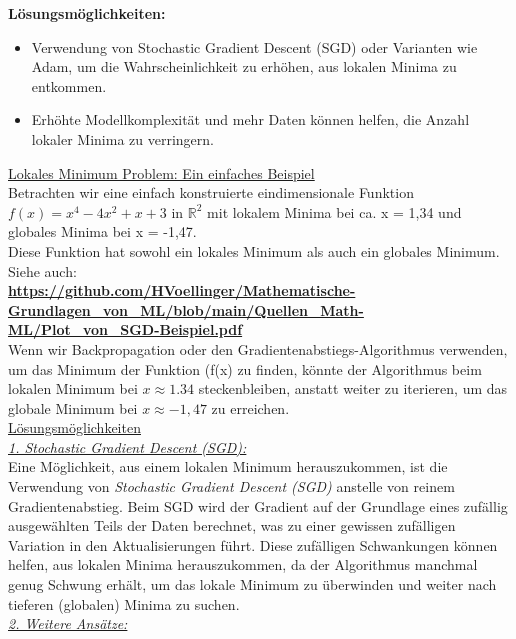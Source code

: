 \documentclass[12pt]{article}
\begin{document}
\textbf{Lösungsmöglichkeiten:}
\begin{itemize}
    \item Verwendung von Stochastic Gradient Descent (SGD) oder Varianten wie Adam, um die Wahrscheinlichkeit zu erhöhen, aus lokalen Minima zu entkommen.
    \item Erhöhte Modellkomplexität und mehr Daten können helfen, die Anzahl lokaler Minima zu verringern.
\end{itemize}
%
%
\underline{Lokales Minimum Problem: Ein einfaches Beispiel}\\[0.3cm]
%
Betrachten wir eine einfach konstruierte eindimensionale Funktion $ f(x) = x^4 - 4x^2 + x + 3 $ in $ \mathbb{R}^2 $ mit lokalem Minima bei ca. x = 1,34 und globales Minima bei x = -1,47.  \\
Diese Funktion hat sowohl ein lokales Minimum als auch ein globales Minimum. Siehe auch:  \\
\textbf{\url{https://github.com/HVoellinger/Mathematische-Grundlagen_von_ML/blob/main/Quellen_Math-ML/Plot_von_SGD-Beispiel.pdf}}\\[0.3cm]
%
Wenn wir Backpropagation oder den Gradientenabstiegs-Algorithmus verwenden, um das Minimum der Funktion (f(x) zu finden, könnte der Algorithmus beim lokalen Minimum bei $ x \approx 1.34 $ steckenbleiben, anstatt weiter zu iterieren, um das globale Minimum bei $ x \approx -1,47 $ zu erreichen.\\[0.4cm]
%
\underline{Lösungsmöglichkeiten}\\[0.1cm]

\underline{\textit{1. Stochastic Gradient Descent (SGD):}} \\[0.2cm]
%
Eine Möglichkeit, aus einem lokalen Minimum herauszukommen, ist die Verwendung von \textit{Stochastic Gradient Descent (SGD)} anstelle von reinem Gradientenabstieg. Beim SGD wird der Gradient auf der Grundlage eines zufällig ausgewählten Teils der Daten berechnet, was zu einer gewissen zufälligen Variation in den Aktualisierungen führt.
%
Diese zufälligen Schwankungen können helfen, aus lokalen Minima herauszukommen, da der Algorithmus manchmal genug Schwung erhält, um das lokale Minimum zu überwinden und weiter nach tieferen (globalen) Minima zu suchen.\\

\underline{\textit{2. Weitere Ansätze:}}
\end{document}

